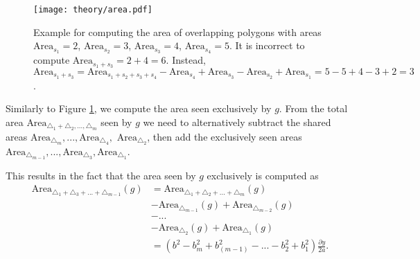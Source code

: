 \begin{figure}[h!]
    \centering
    \texttt{[image: theory/area.pdf]}
    \caption{Example for computing the area of overlapping polygons with areas $\text{Area}_{s_1} = 2$, $\text{Area}_{s_2} = 3$, $\text{Area}_{s_3} = 4$, $\text{Area}_{s_4} = 5$. It is incorrect to compute $\text{Area}_{s_1 + s_3} = 2 + 4 = 6$. Instead, $\text{Area}_{s_1 + s_3} = \text{Area}_{s_1 + s_2 + s_3 + s_4} - \text{Area}_{s_4} + \text{Area}_{s_3} - \text{Area}_{s_2} + \text{Area}_{s_1} = 5 - 5 + 4 - 3 + 2 = 3$.}
    \label{fig:areas}
\end{figure}

Similarly to Figure \ref{fig:areas}, we  compute the area seen exclusively by $g$. From the total area $\text{Area}_{\triangle_1 + \triangle_2, ..., \triangle_m}$ seen by $g$ we need to alternatively subtract the shared areas $\text{Area}_{\triangle_m}, ..., \text{Area}_{\triangle_4},$ $\text{Area}_{\triangle_2}$, then add the exclusively seen areas $\text{Area}_{\triangle_{m - 1}}, ..., \text{Area}_{\triangle_3}, \text{Area}_{\triangle_1}$.


This results in the fact that the area seen by $g$ exclusively is computed as 
\begin{align*}
    \text{Area}_{\triangle_1 + \triangle_3 + ... + \triangle_{m - 1}}(g) &= \text{Area}_{\triangle_1 + \triangle_2 + ... + \triangle_m}(g) \\
    &- \text{Area}_{\triangle_{m - 1}}(g) + \text{Area}_{\triangle_{m - 2}}(g) \\
    &- ... \\
    &- \text{Area}_{\triangle_2}(g) + \text{Area}_{\triangle_1}(g) \\
                                                                         &= \left(b^2 - b_{m}^2 + b_{(m - 1)}^2 - ... - b_{2}^2 + b_{1}^2\right)\frac{\partial y}{2a}.
\end{align*}

